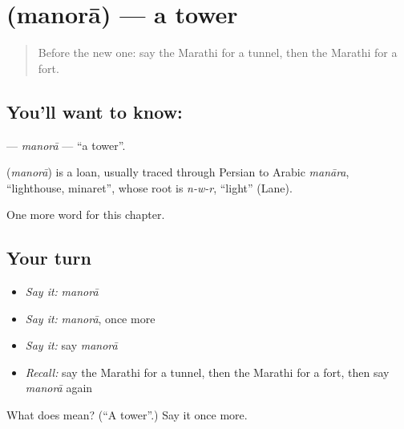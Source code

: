 \section[\texorpdfstring{\mr{मनोरा} (manorā)}{मनोरा (manorā)}]{ (manorā) — a tower}

\label{lesson:MR-C183-manora}



\begin{quote}
Before the new one: say the Marathi for a tunnel, then the Marathi for a fort.
\end{quote}

\subsection*{You'll want to know: }
\textbf{} — \emph{manorā} — \textquotedblleft{}a tower\textquotedblright{}.

\begin{cousinweb}
\textbf{} (\emph{manorā}) is a loan, usually traced through Persian to Arabic \emph{manāra}, \textquotedblleft{}lighthouse, minaret\textquotedblright{}, whose root is \emph{n-w-r}, \textquotedblleft{}light\textquotedblright{} (Lane).
\end{cousinweb}

\begin{grammarlens}[title={What you've built}]
One more word for this chapter.
\end{grammarlens}

\subsection*{Your turn}
\begin{itemize}
\raggedright
  \item \emph{Say it:} \emph{manorā}
  \item \emph{Say it:} \emph{manorā}, once more
  \item \emph{Say it:} say \emph{manorā}
  \item \emph{Recall:} say the Marathi for a tunnel, then the Marathi for a fort, then say \emph{manorā} again
\end{itemize}

\begin{tcolorbox}[breakable,colback=teal!4,colframe=teal!35!black,title={Before you move on}]
What does  mean? (\textquotedblleft{}A tower\textquotedblright{}.) Say it once more.
\end{tcolorbox}
